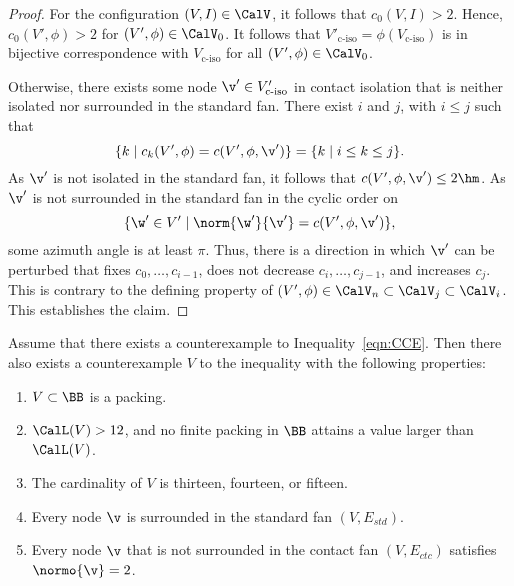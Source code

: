 \begin{proof}
For the configuration $(V,I)\in \CalV$, it follows that $c_0(V,I) >2$.
Hence, $c_0(V',\phi)>2$ for $(V',\phi)\in\CalV_0$.  It follows
that $V'_{\text{c-iso}}=\phi(V_{\text{c-iso}})$ is in bijective correspondence with
$V_{\text{c-iso}}$ for all $(V',\phi)\in \CalV_0$.

Otherwise, there exists some node $\v'\in V'_{\text{c-iso}}$ in contact
isolation that is neither isolated nor surrounded in the standard fan.
There exist $i$ and $j$, with $i\le j$ such that
\[ 
\{k\mid c_k(V',\phi) = c(V',\phi,\v')\} = \{k\mid i\le k\le j\}.
\] 
As $\v'$ is not isolated in the standard fan, it
follows that $c(V',\phi,\v') \le 2\hm$.  As $\v'$ is not surrounded in the
standard fan in the cyclic order on
\[ 
\{\w'\in V' \mid \norm{\w'}{\v'} = c(V',\phi,\v')\},
\] 
some azimuth angle is at least $\pi$.
Thus, there is a direction in which $\v'$ can be perturbed
that  fixes $c_0,\ldots,c_{i-1}$, does not decrease $c_i,\ldots,c_{j-1}$, and increases $c_j$.
This is contrary to the defining property of
$(V',\phi)\in\CalV_n\subset\CalV_j\subset\CalV_i$.  This establishes the claim.
\end{proof}



\begin{lemma}[]\label{lemma:CE} 
  Assume that there exists a counterexample to
  Inequality~\ref{eqn:CCE}.  Then there also exists a counterexample
  $V$ to the inequality with the following properties:
\begin{enumerate}\wasitemize 
\item $V\subset \BB$ is a packing.
\item $\CalL(V) > 12$, and no finite packing in $\BB$ attains a value
  larger than $\CalL(V)$.
\item The cardinality of $V$ is thirteen, fourteen, or fifteen.
\item Every node $\v$ is surrounded in the standard fan $(V,E_{std})$.
\item Every node $\v$ that is not surrounded in the contact fan $(V,E_{ctc})$ satisfies $\normo{\v}=2$.
\end{enumerate}\wasitemize 
\end{lemma}


